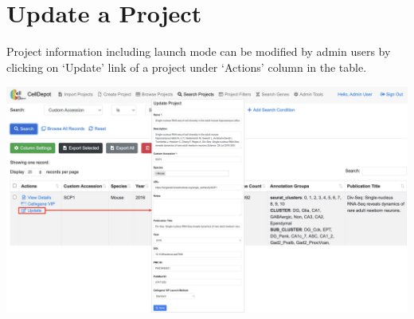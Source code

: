 \documentclass[
  openany]{book}
\begin{document}
\hypertarget{update-a-project}{%
\section{Update a Project}\label{update-a-project}}

Project information including launch mode can be modified by admin users by clicking on `Update' link of a project under `Actions' column in the table.

\href{figures/S11.jpg}{\includegraphics{figures/S11.jpg}}

  
\end{document}
